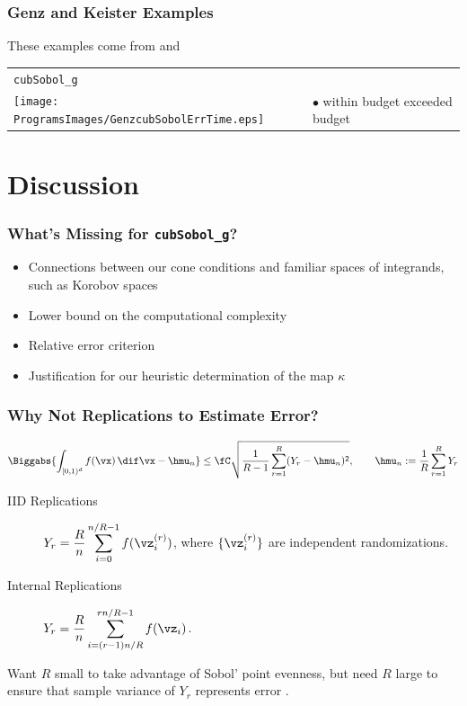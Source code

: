 \documentclass[10pt,compress]{beamer} %
\newcommand{\cube}{[0,1)^d}
\begin{document}
\begin{frame}\frametitle{Genz and Keister Examples}
These examples come from  and 
\begin{center}
\begin{tabular}{>{\centering}m{7.5cm}>{\raggedright}m{3.5cm}}
\texttt{cubSobol\_g} \tabularnewline
\texttt{[image: ProgramsImages/GenzcubSobolErrTime.eps]} &
\alert{$\bullet$} within budget \newline
{\color{brown}{$\bullet$}} exceeded budget
\end{tabular}
\end{center}
\end{frame}

\section{Discussion}
\begin{frame} \frametitle{What's Missing for \texttt{cubSobol\_g}?}

\begin{itemize}

\item Connections between our cone conditions and \alert{familiar spaces} of integrands, such as Korobov spaces

\item Lower bound on the \alert{computational complexity}

\item \alert{Relative} error criterion

\item Justification for our heuristic determination of the map $\kappa$

\end{itemize}

\end{frame}

\begin{frame}\frametitle{Why Not Replications to Estimate Error?}
\vspace{-3ex}
\[
\Biggabs{\int_{\cube} f(\vx) \, \dif \vx 
- \hmu_n} \le \fC \sqrt{\frac{1}{R-1}\sum_{r=1}^R (Y_{r} - \hmu_n)^2},  \qquad \hmu_n:=\frac 1 R \sum_{r=1}^{R} Y_r
\]
\begin{description}

\item[IID Replications] $\displaystyle Y_{r}=\frac{R}{n}\sum_{i=0}^{n/R-1} f(\vz_i^{(r)})$, where $\{\vz_i^{(r)}\}$ are independent randomizations. 

\item[Internal Replications] $\displaystyle Y_{r}=\frac{R}{n}\sum_{i=(r-1)n/R}^{rn/R-1} f(\vz_i)$. 

\end{description}
Want $R$ small to take advantage of Sobol' point evenness, but need $R$ large to ensure that sample variance of $Y_r$ represents error \cite{Den13a,HicEtal14a}.  

\end{frame}
\end{document}
